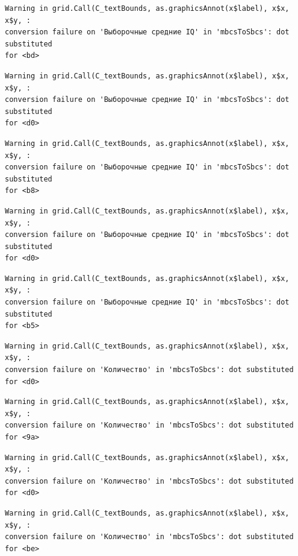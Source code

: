 \documentclass[
  letterpaper,
  DIV=11,
  numbers=noendperiod]{scrreprt}
\theoremstyle{definition}
\theoremstyle{remark}
\begin{document}
\begin{verbatim}
Warning in grid.Call(C_textBounds, as.graphicsAnnot(x$label), x$x, x$y, :
conversion failure on 'Выборочные средние IQ' in 'mbcsToSbcs': dot substituted
for <bd>
\end{verbatim}

\begin{verbatim}
Warning in grid.Call(C_textBounds, as.graphicsAnnot(x$label), x$x, x$y, :
conversion failure on 'Выборочные средние IQ' in 'mbcsToSbcs': dot substituted
for <d0>
\end{verbatim}

\begin{verbatim}
Warning in grid.Call(C_textBounds, as.graphicsAnnot(x$label), x$x, x$y, :
conversion failure on 'Выборочные средние IQ' in 'mbcsToSbcs': dot substituted
for <b8>
\end{verbatim}

\begin{verbatim}
Warning in grid.Call(C_textBounds, as.graphicsAnnot(x$label), x$x, x$y, :
conversion failure on 'Выборочные средние IQ' in 'mbcsToSbcs': dot substituted
for <d0>
\end{verbatim}

\begin{verbatim}
Warning in grid.Call(C_textBounds, as.graphicsAnnot(x$label), x$x, x$y, :
conversion failure on 'Выборочные средние IQ' in 'mbcsToSbcs': dot substituted
for <b5>
\end{verbatim}

\begin{verbatim}
Warning in grid.Call(C_textBounds, as.graphicsAnnot(x$label), x$x, x$y, :
conversion failure on 'Количество' in 'mbcsToSbcs': dot substituted for <d0>
\end{verbatim}

\begin{verbatim}
Warning in grid.Call(C_textBounds, as.graphicsAnnot(x$label), x$x, x$y, :
conversion failure on 'Количество' in 'mbcsToSbcs': dot substituted for <9a>
\end{verbatim}

\begin{verbatim}
Warning in grid.Call(C_textBounds, as.graphicsAnnot(x$label), x$x, x$y, :
conversion failure on 'Количество' in 'mbcsToSbcs': dot substituted for <d0>
\end{verbatim}

\begin{verbatim}
Warning in grid.Call(C_textBounds, as.graphicsAnnot(x$label), x$x, x$y, :
conversion failure on 'Количество' in 'mbcsToSbcs': dot substituted for <be>
\end{verbatim}
\end{document}
